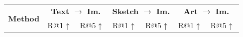 \begin{table}[h]
\centering
\footnotesize
\renewcommand{\arraystretch}{1.05}  %
\setlength{\tabcolsep}{0.5mm}        %
{
{
\begin{tabular}{c|cc|cc|cc}
    \toprule[1.5pt]
    \multirow{2}{*}{\textbf{Method}} & \multicolumn{2}{c|}{\textbf{Text} \textbf{$\rightarrow$} \textbf{Im.}} & \multicolumn{2}{c|}{\textbf{Sketch} \textbf{$\rightarrow$} \textbf{Im.}} & \multicolumn{2}{c}{\textbf{Art} \textbf{$\rightarrow$} \textbf{Im.}}  \\ 
    
    \cmidrule(rl){2-3}\cmidrule(rl){4-5}\cmidrule(rl){6-7}
    & {R@1$\uparrow$} & {R@5$\uparrow$} & {R@1$\uparrow$} & {R@5$\uparrow$} & {R@1$\uparrow$} & {R@5$\uparrow$} \\


\end{tabular}}}
\end{table}
